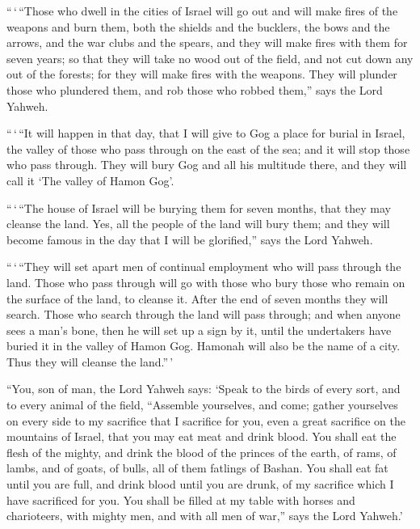  ``\,`\,``Those who dwell in the cities of Israel will go
out and will make fires of the weapons and burn them, both the shields
and the bucklers, the bows and the arrows, and the war clubs and the
spears, and they will make fires with them for seven years;
 so that they will take no wood out of the field, and not
cut down any out of the forests; for they will make fires with the
weapons. They will plunder those who plundered them, and rob those who
robbed them,'' says the Lord Yahweh.

 ``\,`\,``It will happen in that day, that I will give to
Gog a place for burial in Israel, the valley of those who pass through
on the east of the sea; and it will stop those who pass through. They
will bury Gog and all his multitude there, and they will call it `The
valley of Hamon Gog'.

 ``\,`\,``The house of Israel will be burying them for
seven months, that they may cleanse the land.  Yes, all
the people of the land will bury them; and they will become famous in
the day that I will be glorified,'' says the Lord Yahweh.

 ``\,`\,``They will set apart men of continual employment
who will pass through the land. Those who pass through will go with
those who bury those who remain on the surface of the land, to cleanse
it. After the end of seven months they will search. 
Those who search through the land will pass through; and when anyone
sees a man's bone, then he will set up a sign by it, until the
undertakers have buried it in the valley of Hamon Gog. 
Hamonah will also be the name of a city. Thus they will cleanse the
land.''\,'

 ``You, son of man, the Lord Yahweh says: `Speak to the
birds of every sort, and to every animal of the field, ``Assemble
yourselves, and come; gather yourselves on every side to my sacrifice
that I sacrifice for you, even a great sacrifice on the mountains of
Israel, that you may eat meat and drink blood.  You shall
eat the flesh of the mighty, and drink the blood of the princes of the
earth, of rams, of lambs, and of goats, of bulls, all of them fatlings
of Bashan.  You shall eat fat until you are full, and
drink blood until you are drunk, of my sacrifice which I have sacrificed
for you.  You shall be filled at my table with horses and
charioteers, with mighty men, and with all men of war,'' says the Lord
Yahweh.'

